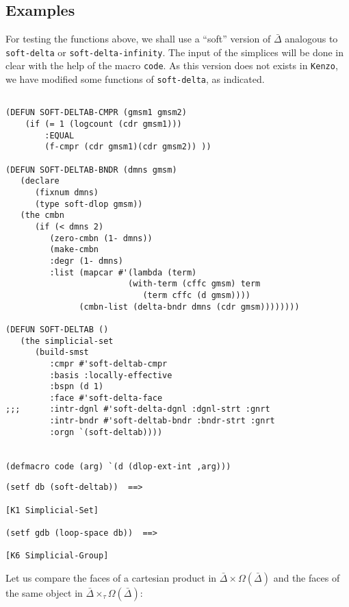 \subsection* {Examples}

For testing the functions above, we shall use a ``soft'' version of $\bar{\Delta}$ analogous
to {\tt soft-delta} or {\tt soft-delta-infinity}. The input of the simplices will be done
in clear with the help of the macro {\tt code}. As this version does not exists in {\tt Kenzo},
we have modified some functions of {\tt soft-delta}, as indicated.
{\footnotesize\begin{verbatim}

(DEFUN SOFT-DELTAB-CMPR (gmsm1 gmsm2)
    (if (= 1 (logcount (cdr gmsm1)))
        :EQUAL
        (f-cmpr (cdr gmsm1)(cdr gmsm2)) ))

(DEFUN SOFT-DELTAB-BNDR (dmns gmsm)
   (declare
      (fixnum dmns)
      (type soft-dlop gmsm))
   (the cmbn
      (if (< dmns 2)
         (zero-cmbn (1- dmns))
         (make-cmbn
         :degr (1- dmns)
         :list (mapcar #'(lambda (term)
                         (with-term (cffc gmsm) term
                            (term cffc (d gmsm))))
               (cmbn-list (delta-bndr dmns (cdr gmsm))))))))

(DEFUN SOFT-DELTAB ()
   (the simplicial-set
      (build-smst
         :cmpr #'soft-deltab-cmpr
         :basis :locally-effective
         :bspn (d 1)
         :face #'soft-delta-face
;;;      :intr-dgnl #'soft-delta-dgnl :dgnl-strt :gnrt
         :intr-bndr #'soft-deltab-bndr :bndr-strt :gnrt
         :orgn `(soft-deltab))))


(defmacro code (arg) `(d (dlop-ext-int ,arg)))
\end{verbatim}}
\newpage
{\footnotesize\begin{verbatim}
(setf db (soft-deltab))  ==>

[K1 Simplicial-Set]

(setf gdb (loop-space db))  ==>

[K6 Simplicial-Group]
\end{verbatim}}
Let us compare the faces of a cartesian product in $\bar{\Delta} \times \Omega(\bar{\Delta})$
and the faces of the same object in $\bar{\Delta} \times_\tau \Omega(\bar{\Delta})$:
